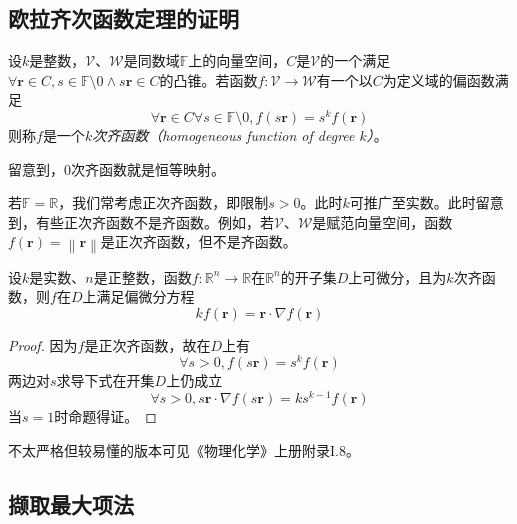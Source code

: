 \documentclass[main.tex]{subfiles}
\begin{document}
\subsection{欧拉齐次函数定理的证明}\label{sec:A.1_Euler_theorem_homogeneous_function}
\begin{definition}
    设$k$是整数，$\mathcal{V}$、$\mathcal{W}$是同数域$\mathbb{F}$上的向量空间，$C$是$\mathcal{V}$的一个满足$\forall\mathbf{r}\in C,s\in\mathbb{F}\setminus 0\wedge s\mathbf{r}\in C$的凸锥。若函数$f:\mathcal{V}\rightarrow\mathcal{W}$有一个以$C$为定义域的偏函数满足
    \[
        \forall \mathbf{r}\in C\forall s\in\mathbb{F}\setminus 0,f\left(s\mathbf{r}\right)=s^kf\left(\mathbf{r}\right)
    \]
    则称$f$是一个\emph{$k$次齐函数（homogeneous function of degree $k$）}。
\end{definition}

留意到，0次齐函数就是恒等映射。

若$\mathbb{F}=\mathbb{R}$，我们常考虑正次齐函数，即限制$s>0$。此时$k$可推广至实数。此时留意到，有些正次齐函数不是齐函数。例如，若$\mathcal{V}$、$\mathcal{W}$是赋范向量空间，函数$f\left(\mathbf{r}\right)=\left\|\mathbf{r}\right\|$是正次齐函数，但不是齐函数。

\begin{theorem}[齐函数的欧拉定理]\label{thm:Euler_theorem_for_homogeneous_function}
    设$k$是实数、$n$是正整数，函数$f:\mathbb{R}^n\rightarrow\mathbb{R}$在$\mathbb{R}^n$的开子集$D$上可微分，且为$k$次齐函数，则$f$在$D$上满足偏微分方程
    \[kf\left(\mathbf{r}\right)=\mathbf{r}\cdot\nabla f\left(\mathbf{r}\right)\]
\end{theorem}
\begin{proof}
    因为$f$是正次齐函数，故在$D$上有
    \[\forall s>0,f\left(s\mathbf{r}\right)=s^kf\left(\mathbf{r}\right)\]
    两边对$s$求导下式在开集$D$上仍成立
    \[\forall s>0,s\mathbf{r}\cdot\nabla f\left(s\mathbf{r}\right)=ks^{k-1}f\left(\mathbf{r}\right)\]
    当$s=1$时命题得证。
\end{proof}

不太严格但较易懂的版本可见《物理化学》上册附录I.8。
\subsection{撷取最大项法}
\end{document}
